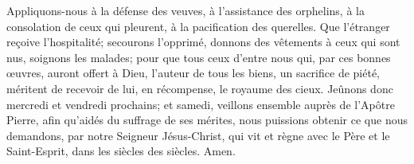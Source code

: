 Appliquons-nous à la défense des veuves, à l’assistance des orphelins,
	à la consolation de ceux qui pleurent, à la pacification des querelles.
Que l’étranger reçoive l’hospitalité;
	secourons l’opprimé, donnons des vêtements à ceux qui sont nus,
	soignons les malades;
	pour que tous ceux d’entre nous qui, par ces bonnes œuvres,
	auront offert à Dieu, l’auteur de tous les biens, un sacrifice de piété,
	méritent de recevoir de lui, en récompense, le royaume des cieux.
Jeûnons donc mercredi et vendredi prochains;
	et samedi, veillons ensemble auprès de l’Apôtre Pierre,
	afin qu’aidés du suffrage de ses mérites,
	nous puissions obtenir ce que nous demandons,
	par notre Seigneur Jésus-Christ,
		qui vit et règne avec le Père et le Saint-Esprit,
	dans les siècles des siècles. Amen.
